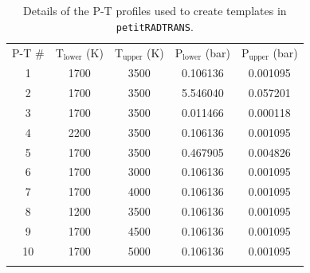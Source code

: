 \documentclass{aa}
\begin{document}
\begin{appendix}
\begin{table}[h!]
    \caption{Details of the P-T profiles used to create templates in \texttt{petitRADTRANS}.}
    \label{tab:tp_details}
    \centering
    \begin{tabular}{c c c c c}
        \hline \hline
        \noalign{\smallskip}
        P-T \# & T$_\mathrm{lower}$ (K) & T$_\mathrm{upper}$ (K) & P$_\mathrm{lower}$ (bar) & P$_\mathrm{upper}$ (bar)\\
        \noalign{\smallskip}
        \hline
        \noalign{\smallskip}
        1  & 1700 & 3500  & 0.106136 & 0.001095 \\
        2  & 1700 & 3500  & 5.546040 & 0.057201 \\
        3  & 1700 & 3500  & 0.011466 & 0.000118 \\
        4  & 2200 & 3500  & 0.106136 & 0.001095 \\
        5  & 1700 & 3500  & 0.467905 & 0.004826 \\
        6  & 1700 & 3000  & 0.106136 & 0.001095 \\
        7  & 1700 & 4000  & 0.106136 & 0.001095 \\
        8  & 1200 & 3500  & 0.106136 & 0.001095 \\
        9  & 1700 & 4500  & 0.106136 & 0.001095 \\
        10 & 1700 & 5000  & 0.106136 & 0.001095 \\

        \noalign{\smallskip}
        \hline
    \end{tabular}
\end{table}



\end{appendix}
\end{document}
